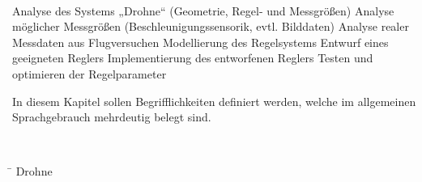 


\missing\

Analyse des Systems „Drohne“ (Geometrie, Regel- und Messgrößen)
Analyse möglicher Messgrößen (Beschleunigungssensorik, evtl. Bilddaten)
Analyse realer Messdaten aus Flugversuchen
Modellierung des Regelsystems
Entwurf eines geeigneten Reglers
Implementierung des entworfenen Reglers
Testen und optimieren der Regelparameter




In diesem Kapitel sollen Begrifflichkeiten definiert werden, welche im allgemeinen Sprachgebrauch mehrdeutig belegt sind.





\missing\

\begin{tabbing}
\hspace{8cm} \= \kill
Drohne \> \Quad\




\end{tabbing}

